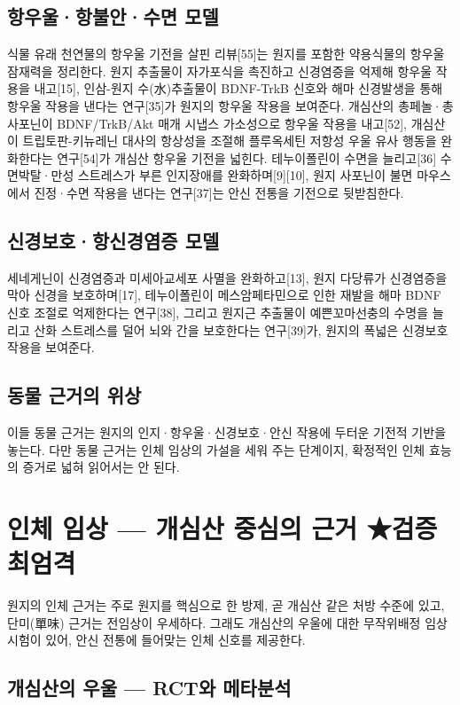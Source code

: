 \documentclass[12pt,oneside]{book}
\begin{document}
\subsection{항우울·항불안·수면 모델}

식물 유래 천연물의 항우울 기전을 살핀 리뷰[55]는 원지를 포함한 약용식물의 항우울 잠재력을 정리한다. 원지 추출물이 자가포식을 촉진하고 신경염증을 억제해 항우울 작용을 내고[15], 인삼-원지 수(水)추출물이 BDNF-TrkB 신호와 해마 신경발생을 통해 항우울 작용을 낸다는 연구[35]가 원지의 항우울 작용을 보여준다. 개심산의 총페놀·총사포닌이 BDNF/TrkB/Akt 매개 시냅스 가소성으로 항우울 작용을 내고[52], 개심산이 트립토판-키뉴레닌 대사의 항상성을 조절해 플루옥세틴 저항성 우울 유사 행동을 완화한다는 연구[54]가 개심산 항우울 기전을 넓힌다. 테누이폴린이 수면을 늘리고[36] 수면박탈·만성 스트레스가 부른 인지장애를 완화하며[9][10], 원지 사포닌이 불면 마우스에서 진정·수면 작용을 낸다는 연구[37]는 안신 전통을 기전으로 뒷받침한다.

\subsection{신경보호·항신경염증 모델}

세네게닌이 신경염증과 미세아교세포 사멸을 완화하고[13], 원지 다당류가 신경염증을 막아 신경을 보호하며[17], 테누이폴린이 메스암페타민으로 인한 재발을 해마 BDNF 신호 조절로 억제한다는 연구[38], 그리고 원지근 추출물이 예쁜꼬마선충의 수명을 늘리고 산화 스트레스를 덜어 뇌와 간을 보호한다는 연구[39]가, 원지의 폭넓은 신경보호 작용을 보여준다.

\subsection{동물 근거의 위상}

이들 동물 근거는 원지의 인지·항우울·신경보호·안신 작용에 두터운 기전적 기반을 놓는다. 다만 동물 근거는 인체 임상의 가설을 세워 주는 단계이지, 확정적인 인체 효능의 증거로 넓혀 읽어서는 안 된다.

\section{인체 임상 — 개심산 중심의 근거 ★검증 최엄격}

원지의 인체 근거는 주로 원지를 핵심으로 한 방제, 곧 개심산 같은 처방 수준에 있고, 단미(單味) 근거는 전임상이 우세하다. 그래도 개심산의 우울에 대한 무작위배정 임상시험이 있어, 안신 전통에 들어맞는 인체 신호를 제공한다.

\subsection{개심산의 우울 — RCT와 메타분석}
\end{document}
